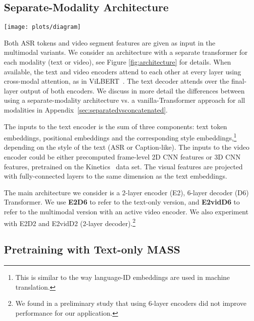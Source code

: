 \documentclass[11pt,a4paper]{article}
\begin{document}
\subsection{Separate-Modality Architecture \label{sec:arch}}

\begin{figure*}
    \centering
    \texttt{[image: plots/diagram]}
    \caption{A diagram for the separate-modality architecture. It consists of a two-stream (text and video inputs) encoder with cross-modal attention and a text-only decoder, jointly trained using the MASS objective.
}
    \label{fig:architecture}
\end{figure*}

Both ASR tokens and video segment features are given as input in the multimodal variants. We consider an architecture with a separate transformer for each modality (text or video), see Figure \ref{fig:architecture} for details. 
When available, the text and video encoders attend to each other at every layer using cross-modal attention, as in ViLBERT~\cite{lu2019vilbert}.
The text decoder attends over the final-layer output of both encoders.
We discuss in more detail the differences between using a separate-modality architecture vs. a vanilla-Transformer approach for all modalities in Appendix~\ref{sec:separatedvsconcatenated}.

The inputs to the text encoder is the sum of three components: 
text token embeddings, positional embeddings and the corresponding style embeddings,\footnote{This is similar to the way language-ID embeddings are used in machine translation.} depending on the style of the text (ASR or Caption-like).
The inputs to the video encoder could be either precomputed frame-level 2D CNN features or 3D CNN features, pretrained on the Kinetics~\cite{Carreira2017QuoVA, Kay2017TheKH} data set.
The visual features are projected with fully-connected layers to the same dimension as the text embeddings.


The main architecture we consider is a 2-layer encoder (E2), 6-layer decoder (D6) Transformer.
We use \textbf{E2D6} to refer to the text-only version, and \textbf{E2vidD6} to refer to the multimodal version with an active video encoder.
We also experiment with E2D2 and E2vidD2 (2-layer decoder).\footnote{We found in a preliminary study that using 6-layer encoders did not improve performance for our application.}


\subsection{Pretraining with Text-only MASS}
\end{document}
